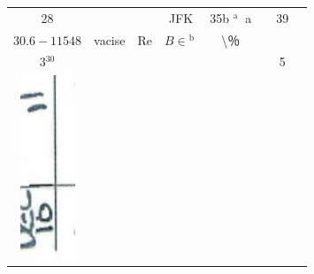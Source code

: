 \documentclass[10pt]{article}
\begin{document}
\begin{center}
\begin{tabular}{|c|c|c|c|c|c|c|c|}
 &  &  &  \\
\hline
28 &  &  & JFK & 35b \({ }^{\text {a }}\) a &  & 39 &  \\
\hline
\(30.6-11548\) & vacise & Re & \(B \in{ }^{\text {b }}\) & \textbackslash ％ &  &  &  \\
\hline
\(3{ }^{30}\) &  &  &  &  &  & 5 &  \\
\hline
\includegraphics[max width=\textwidth]{2025_02_27_dd68c3d38de88f0516d9g-122(4)}

\end{tabular}
\end{center}
\end{document}
